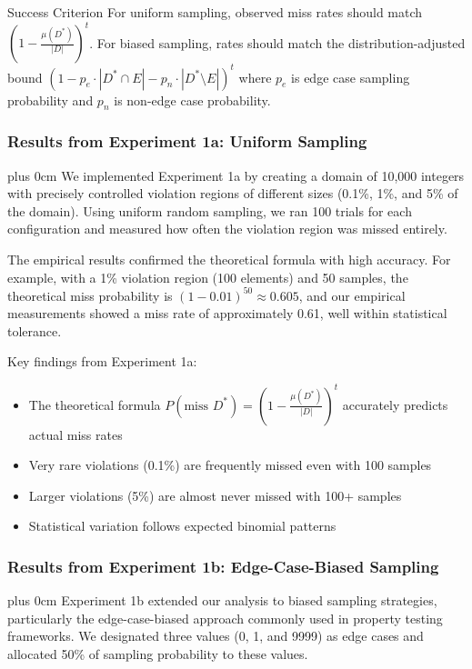 \documentclass[conference]{IEEEtran}
\newcommand{\justifytext}{\leftskip=0pt \rightskip=0pt plus 0cm}
\begin{document}
\begin{definitionbox}{Success Criterion}
For uniform sampling, observed miss rates should match $\left(1 - \frac{\mu(D^*)}{|D|}\right)^t$. For biased sampling, rates should match the distribution-adjusted bound $(1 - p_e\cdot|D^*\cap E| - p_n\cdot|D^*\setminus E|)^t$ where $p_e$ is edge case sampling probability and $p_n$ is non-edge case probability.
\end{definitionbox}

\subsubsection{Results from Experiment 1a: Uniform Sampling}

\justifytext
We implemented Experiment 1a by creating a domain of 10,000 integers with precisely controlled violation regions of different sizes (0.1\%, 1\%, and 5\% of the domain). Using uniform random sampling, we ran 100 trials for each configuration and measured how often the violation region was missed entirely.

The empirical results confirmed the theoretical formula with high accuracy. For example, with a 1\% violation region (100 elements) and 50 samples, the theoretical miss probability is $(1 - 0.01)^{50} \approx 0.605$, and our empirical measurements showed a miss rate of approximately 0.61, well within statistical tolerance.

Key findings from Experiment 1a:
\begin{itemize}
\item The theoretical formula $P(\text{miss }D^*) = \left(1 - \frac{\mu(D^*)}{|D|}\right)^t$ accurately predicts actual miss rates
\item Very rare violations (0.1\%) are frequently missed even with 100 samples
\item Larger violations (5\%) are almost never missed with 100+ samples
\item Statistical variation follows expected binomial patterns
\end{itemize}

\subsubsection{Results from Experiment 1b: Edge-Case-Biased Sampling}

\justifytext
Experiment 1b extended our analysis to biased sampling strategies, particularly the edge-case-biased approach commonly used in property testing frameworks. We designated three values (0, 1, and 9999) as edge cases and allocated 50\% of sampling probability to these values.
\end{document}
